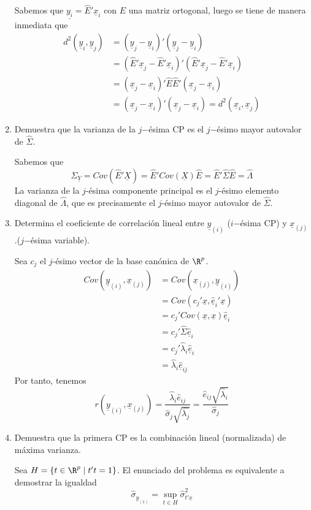 \documentclass[twoside]{article}
\newcommand{\muestra}[1]{{\underline{#1}}}
\newcommand{\m}[1]{{\muestra{#1}}}
\newcommand{\ev}{\m{\hat{e}}}
\begin{document}
\begin{enumerate}
Sabemos que $\muestra{y_i} = \hat{E}'\m{x}_i$ con $E$ una matriz ortogonal, luego se tiene de manera inmediata que 
\begin{align*}
d^2(\m{y}_i,\m{y}_j)&=(\m{y}_j-\m{y}_i)'(\m{y}_j-\m{y}_i)\\
& = (\hat{E}'\m{x}_j-\hat{E}'\m{x}_i)'(\hat{E}'\m{x}_j-\hat{E}'\m{x}_i)\\
& = (\m{x}_j-\m{x}_i)'\hat{E}\hat{E}'(\m{x}_j-\m{x}_i)\\
& = (\m{x}_j-\m{x}_i) '(\m{x}_j-\m{x}_i) = d^2(\m{x}_i,\m{x}_j)
\end{align*}

\item Demuestra que la varianza de la $j$−ésima CP es el $j$−ésimo mayor autovalor de $\widehat{\Sigma}$.

Sabemos que $$\Sigma_{\muestra{Y}} = Cov(\hat{E}'\muestra{X})= \hat{E}'Cov(\muestra{X})\hat{E} =\hat{E}' \hat{\Sigma}\hat{E}= \hat{\Lambda}$$
La varianza de la $j$-ésima componente principal es el $j$-ésimo elemento diagonal de $\hat{\Lambda}$, que es precisamente el $j$-ésimo mayor autovalor de $\hat{\Sigma}$.

\item Determina el coeficiente de correlación lineal entre $\muestra{y}_{{(i)}}$ ($i$−ésima CP) y $\muestra{x}_{(j)}$ .($j$−ésima variable).

Sea $c_j$ el $j$-ésimo vector de la base canónica de $\R^p$.
\begin{align*}
Cov(\muestra{y}_{{(i)}},\muestra{x}_{{(j)}}) &= Cov(\muestra{x}_{{(j)}},\muestra{y}_{{(i)}})\\
& = Cov(c_j'\muestra{x},\ev_i' \muestra{x})\\
&= c_j'Cov(\muestra{x},\muestra{x})\ev_i \\
&= c_j'\hat{\Sigma}\ev_i \\
&= c_j' \hat{\lambda}_i\ev_i \\
&= \hat{\lambda}_i \ev_{ij}
\end{align*} 
Por tanto, tenemos
$$
r(\muestra{y}_{{(i)}},\muestra{x}_{{(j)}}) = \frac{\hat{\lambda}_i \hat{e}_{ij}}{\hat{\sigma}_{j}\sqrt{\hat{\lambda_j}}} = \frac{\hat{e}_{ij}\sqrt{\hat{\lambda}_i}}{\hat{\sigma}_j}
$$
\newpage
\item Demuestra que la primera CP es la combinación lineal (normalizada) de máxima varianza. 

Sea $H=\{t\in \R^p \mid t't=1\}$. El enunciado del problema es equivalente a demostrar la igualdad
$$
\hat{\sigma}_{\muestra{y}_{(1)}}=\sup_{t\in H}\hat{\sigma}^2_{t'\muestra{x}}
$$


\end{enumerate}
\end{document}
